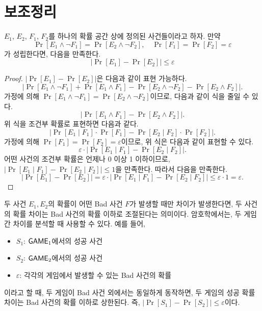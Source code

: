 \section{보조정리}

\begin{tcolorbox}[colback=white]
    \begin{lemma}
        $E_1$, $E_2$, $F_1$, $F_2$를 하나의 확률 공간 상에 정의된 사건들이라고
        하자. 만약
        $$
            \Pr[E_1 \land \neg F_1] = \Pr[E_2 \land \neg F_2], \quad \Pr[F_1] = \Pr[F_2] = \varepsilon
        $$
        가 성립한다면, 다음을 만족한다.
        $$
            |\Pr[E_1] - \Pr[E_2]| \leq \varepsilon
        $$
    \end{lemma}
\end{tcolorbox}

\begin{proof}
    $|\Pr[E_1] - \Pr[E_2]|$은 다음과 같이 표현 가능하다.
    $$
        |\Pr[E_1 \land \neg F_1] + \Pr[E_1 \land F_1] - \Pr[E_2 \land \neg F_2] - \Pr[E_2 \land F_2]|.
    $$
    가정에 의해 $\Pr[E_1 \land \neg F_1] = \Pr[E_2 \land \neg F_2]$이므로, 다음과 같이 식을 줄일 수 있다.
    $$
        |\Pr[E_1 \land F_1] - \Pr[E_2 \land F_2]|.
    $$
    위 식을 조건부 확률로 표현하면 다음과 같다.
    $$
        |\Pr[E_1 \mid F_1] \cdot \Pr[F_1] - \Pr[E_2 \mid F_2] \cdot \Pr[F_2]|.
    $$
    가정에 의해 $\Pr[F_1] = \Pr[F_2] = \varepsilon$이므로, 위 식은 다음과 같이
    표현할 수 있다.
    $$
    \varepsilon \cdot |\Pr[E_1 \mid F_1]- \Pr[E_2 \mid F_2]|.
    $$
    어떤 사건의 조건부 확률은 언제나 0 이상 1 이하이므로, $|\Pr[E_1 \mid F_1] -
    \Pr[E_2 \mid F_2]| \leq 1$을 만족한다. 따라서 다음을 만족한다.
    $$
    |\Pr[E_1] - \Pr[E_2]| = \varepsilon \cdot |\Pr[E_1 \mid F_1] - \Pr[E_2 \mid F_2]| \leq \varepsilon \cdot 1 = \varepsilon.
    $$
\end{proof}

\begin{memo}
    두 사건 $E_1, E_2$의 확률이 어떤 Bad 사건 $F$가 발생할 때만 차이가
    발생한다면, 두 사건의 확률 차이는 Bad 사건의 확률 이하로 조절된다는
    의미이다. 암호학에서는, 두 게임 간 차이를 분석할 때 사용할 수 있다. 예를 들어, 
    \begin{itemize}
        \item $S_1$: $\textsf{GAME}_1$에서의 성공 사건
        \item $S_2$: $\textsf{GAME}_2$에서의 성공 사건
        \item $\varepsilon$: 각각의 게임에서 발생할 수 있는 Bad 사건의 확률
    \end{itemize}
    이라고 할 때, 두 게임이 Bad 사건 외에서는 동일하게 동작하면, 두 게임의 성공
    확률 차이는 Bad 사건의 확률 이하로 상한된다. 즉, $|\Pr[S_1] - \Pr[S_2]| \leq \varepsilon$이다.
\end{memo}
